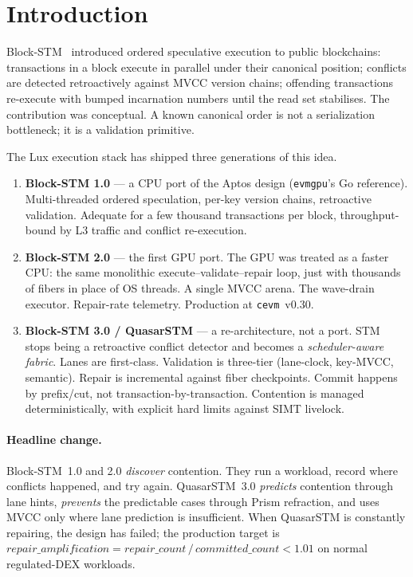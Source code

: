 \section{Introduction}

\label{sec:introduction}

Block-STM~\cite{gelashvili2022blockstm} introduced ordered speculative
execution to public blockchains: transactions in a block execute in
parallel under their canonical position; conflicts are detected
retroactively against MVCC version chains; offending transactions
re-execute with bumped incarnation numbers until the read set stabilises.
The contribution was conceptual. A known canonical order is not a
serialization bottleneck; it is a validation primitive.

The Lux execution stack has shipped three generations of this idea.

\begin{enumerate}[leftmargin=2em]
\item \textbf{Block-STM 1.0} --- a CPU port of the Aptos design
  (\texttt{evmgpu}'s Go reference). Multi-threaded ordered speculation,
  per-key version chains, retroactive validation. Adequate for a few
  thousand transactions per block, throughput-bound by L3 traffic and
  conflict re-execution.
\item \textbf{Block-STM 2.0} --- the first GPU port. The GPU was treated
  as a faster CPU: the same monolithic
  execute--validate--repair loop, just with thousands of fibers in place
  of OS threads. A single MVCC arena. The wave-drain executor.
  Repair-rate telemetry. Production at \texttt{cevm}~v0.30.
\item \textbf{Block-STM 3.0 / QuasarSTM} --- a re-architecture, not a
  port. STM stops being a retroactive conflict detector and becomes
  a \emph{scheduler-aware fabric}. Lanes are first-class. Validation
  is three-tier (lane-clock, key-MVCC, semantic). Repair is
  incremental against fiber checkpoints. Commit happens by
  prefix/cut, not transaction-by-transaction. Contention is managed
  deterministically, with explicit hard limits against SIMT livelock.
\end{enumerate}

\paragraph{Headline change.}
Block-STM~1.0 and 2.0 \emph{discover} contention. They run a workload,
record where conflicts happened, and try again. QuasarSTM~3.0
\emph{predicts} contention through lane hints, \emph{prevents}
the predictable cases through Prism refraction, and uses MVCC only
where lane prediction is insufficient. When QuasarSTM is constantly
repairing, the design has failed; the production target is
$\mathit{repair\_amplification} = \mathit{repair\_count}\,/\,
\mathit{committed\_count} < 1.01$ on normal regulated-DEX workloads.

